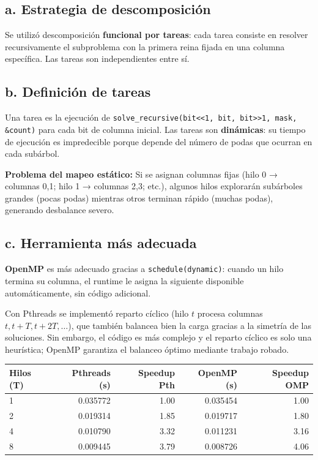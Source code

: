 \documentclass[11pt,a4paper]{article}
\begin{document}
\subsection*{a. Estrategia de descomposición}
Se utilizó descomposición \textbf{funcional por tareas}: cada tarea consiste en resolver recursivamente el subproblema con la primera reina fijada en una columna específica. Las tareas son independientes entre sí.

\subsection*{b. Definición de tareas}
Una tarea es la ejecución de \texttt{solve\_recursive(bit<<1, bit, bit>>1, mask, \&count)} para cada bit de columna inicial. Las tareas son \textbf{dinámicas}: su tiempo de ejecución es impredecible porque depende del número de podas que ocurran en cada subárbol.

\textbf{Problema del mapeo estático:} Si se asignan columnas fijas (hilo 0 → columnas 0,1; hilo 1 → columnas 2,3; etc.), algunos hilos explorarán subárboles grandes (pocas podas) mientras otros terminan rápido (muchas podas), generando desbalance severo.

\subsection*{c. Herramienta más adecuada}
\textbf{OpenMP} es más adecuado gracias a \texttt{schedule(dynamic)}: cuando un hilo termina su columna, el runtime le asigna la siguiente disponible automáticamente, sin código adicional.

Con Pthreads se implementó reparto cíclico (hilo $t$ procesa columnas $t, t+T, t+2T,\ldots$), que también balancea bien la carga gracias a la simetría de las soluciones. Sin embargo, el código es más complejo y el reparto cíclico es solo una heurística; OpenMP garantiza el balanceo óptimo mediante trabajo robado.

\begin{center}
\begin{tabular}{|l|r|r|r|r|}
\hline
\textbf{Hilos (T)} & \textbf{Pthreads (s)} & \textbf{Speedup Pth} & \textbf{OpenMP (s)} & \textbf{Speedup OMP} \\
\hline
1 & 0.035772 & 1.00 & 0.035454 & 1.00 \\
2 & 0.019314 & 1.85 & 0.019717 & 1.80 \\
4 & 0.010790 & 3.32 & 0.011231 & 3.16 \\
8 & 0.009445 & 3.79 & 0.008726 & 4.06 \\
\hline
\end{tabular}
\end{center}
\end{document}
